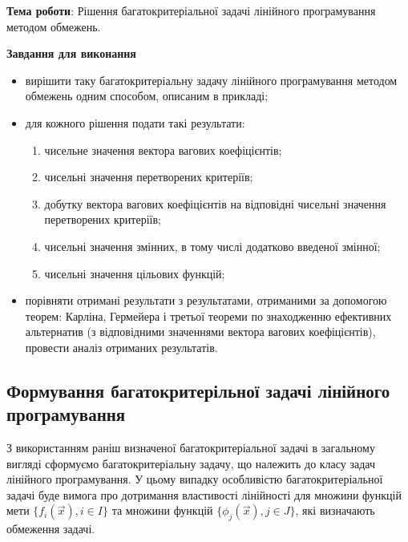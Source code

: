 


\newcommand{\labnumber}{4} %



\usepackage{systeme}
\usepackage{longtable,tabu}
\usepackage{multirow}
\usepackage{array,multirow}
\usepackage{pdflscape}
\usepackage{afterpage}
\usepackage{bm}

\graphicspath{{../figures/}}


\Ukrainian


\addtocounter{page}{1}

\textbf{Тема роботи}: Рішення багатокритеріальної задачі лінійного програмування методом обмежень.

\textbf{Завдання для виконання}
\begin{itemize}
	\item вирішити таку багатокритеріальну задачу лінійного програмування методом обмежень одним способом, описаним в прикладі;
	\item для кожного рішення подати такі результати:
	\begin{enumerate}[label=\arabic*)]
		\item чисельне значення вектора вагових коефіцієнтів;
		\item чисельні значення перетворених критеріїв;
		\item добутку вектора вагових коефіцієнтів на відповідні чисельні значення перетворених критеріїв;
		\item чисельні значення змінних, в тому числі додатково введеної змінної;
		\item чисельні значення цільових функцій;
	\end{enumerate}
	\item порівняти отримані результати з результатами, отриманими за допомогою теорем: Карліна, Гермейера і третьої теореми по знаходженню ефективних альтернатив (з відповідними значеннями вектора вагових коефіцієнтів), провести аналіз отриманих результатів.
\end{itemize}



\subsection{Формування багатокритерільної задачі лінійного програмування}

З використанням раніш визначеної багатокритеріальної задачі в загальному вигляді сформуємо багатокритеріальну задачу, що належить до класу задач лінійного програмування. 
У цьому випадку особливістю багатокритеріальної задачі буде вимога про дотримання властивості лінійності для множини функцій мети $\{ f_i(\vec{x}), i \in I \}$ та множини функцій $\{ \phi_j(\vec{x}), j \in J\}$, які визначають обмеження задачі.

